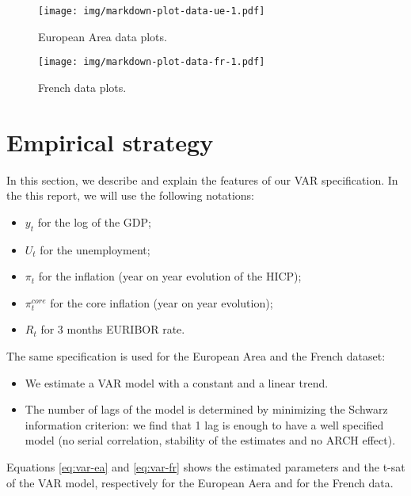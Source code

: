 \documentclass[
  10pt,
]{article}
\providecommand{\tightlist}{%
  \setlength{\itemsep}{0pt}\setlength{\parskip}{0pt}}
\begin{document}
\begin{figure}
\centering
\texttt{[image: img/markdown-plot-data-ue-1.pdf]}
\caption{\label{fig:plot-data-ue}European Area data plots.}
\end{figure}

\begin{figure}
\centering
\texttt{[image: img/markdown-plot-data-fr-1.pdf]}
\caption{\label{fig:plot-data-fr}French data plots.}
\end{figure}

\hypertarget{empirical-strategy}{%
\section{Empirical strategy}\label{empirical-strategy}}

In this section, we describe and explain the features of our VAR specification.
In the this report, we will use the following notations:

\begin{itemize}
\tightlist
\item
  \(y_t\) for the log of the GDP;
\item
  \(U_t\) for the unemployment;
\item
  \(\pi_t\) for the inflation (year on year evolution of the HICP);
\item
  \(\pi_t^{core}\) for the core inflation (year on year evolution);
\item
  \(R_t\) for 3 months EURIBOR rate.
\end{itemize}

The same specification is used for the European Area and the French dataset:

\begin{itemize}
\item
  We estimate a VAR model with a constant and a linear trend.
\item
  The number of lags of the model is determined by minimizing the Schwarz information criterion: we find that 1 lag is enough to have a well specified model (no serial correlation, stability of the estimates and no ARCH effect).
\end{itemize}

Equations \eqref{eq:var-ea} and \eqref{eq:var-fr} shows the estimated parameters and the t-sat of the VAR model, respectively for the European Aera and for the French data.
\end{document}
